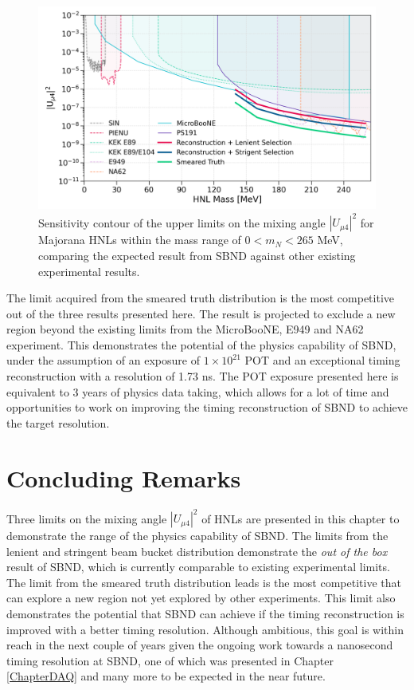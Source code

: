 \begin{figure}[bp!]
    \centering
    \includegraphics[width=\textwidth]{sensitivity}
    \caption{Sensitivity contour of the upper limits on the mixing angle $|U_{\mu4}|^2$ for Majorana HNLs within the mass range of $0 < m_N < 265$ MeV, comparing the expected result from SBND against other existing experimental results.}
    \label{fig:sensitivity}
\end{figure}

The limit acquired from the smeared truth distribution is the most competitive out of the three results presented here.
The result is projected to exclude a new region beyond the existing limits from the MicroBooNE, E949 and NA62 experiment.
This demonstrates the potential of the physics capability of SBND, under the assumption of an exposure of $1 \times 10^{21}$ POT and an exceptional timing reconstruction with a resolution of 1.73 ns.
The POT exposure presented here is equivalent to 3 years of physics data taking, which allows for a lot of time and opportunities to work on improving the timing reconstruction of SBND to achieve the target resolution.


\section{Concluding Remarks}
\label{sec:result_remarks}

Three limits on the mixing angle $|U_{\mu4}|^2$ of HNLs are presented in this chapter to demonstrate the range of the physics capability of SBND.
The limits from the lenient and stringent beam bucket distribution demonstrate the \textit{out of the box} result of SBND, which is currently comparable to existing experimental limits.
The limit from the smeared truth distribution leads is the most competitive that can explore a new region not yet explored by other experiments.
This limit also demonstrates the potential that SBND can achieve if the timing reconstruction is improved with a better timing resolution.
Although ambitious, this goal is within reach in the next couple of years given the ongoing work towards a nanosecond timing resolution at SBND, one of which was presented in Chapter \ref{ChapterDAQ} and many more to be expected in the near future.
 


